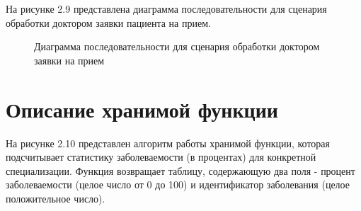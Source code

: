 На рисунке 2.9 представлена диаграмма последовательности для сценария обработки доктором заявки пациента на прием.
\begin{figure}[!h]
	\caption{Диаграмма последовательности для сценария обработки доктором заявки на прием}
\end{figure}

\clearpage

\section{Описание хранимой функции}

На рисунке 2.10 представлен алгоритм работы хранимой функции, которая подсчитывает статистику заболеваемости (в процентах) для конкретной специализации. Функция возвращает таблицу, содержающую два поля - процент заболеваемости (целое число от 0 до 100) и идентификатор заболевания (целое положительное число).

